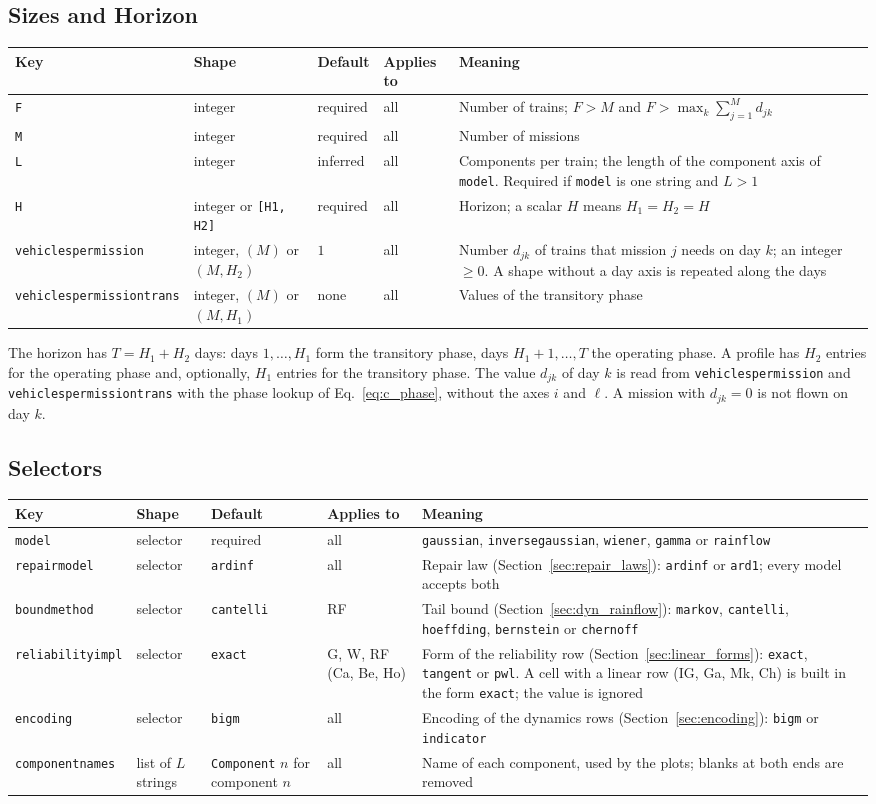 \documentclass[11pt,a4paper]{article}
\makeatletter
\theoremstyle{plain}
\theoremstyle{definition}
\renewcommand{\_}{\textunderscore\allowbreak{}}
\providecommand{\keyrow}[5]{{\raggedright #1\par} & {\raggedright #2\par} & {\raggedright #3\par} & {\raggedright #4\par} & {\raggedright #5\par} \\}
\providecommand{\tabstart}[2]{\begingroup\small\begin{longtable}{@{}#1@{}}\toprule #2 \\ \midrule \endhead}
\providecommand{\tabend}{\bottomrule\end{longtable}\endgroup}
\providecommand{\keytab}{\tabstart{p{3.2cm}p{2.2cm}p{1.8cm}p{1.9cm}p{4.5cm}}{Key & Shape & Default & Applies to & Meaning}}
\makeatother
\begin{document}
\subsection{Sizes and Horizon}\label{sec:input_scalars}

\keytab
\keyrow{\texttt{F}}{integer}{required}{all}{Number of trains; $F > M$ and $F > \max_k \sum_{j=1}^{M} d_{jk}$}
\keyrow{\texttt{M}}{integer}{required}{all}{Number of missions}
\keyrow{\texttt{L}}{integer}{inferred}{all}{Components per train; the length of the component axis of \texttt{model}. Required if \texttt{model} is one string and $L > 1$}
\keyrow{\texttt{H}}{integer or \texttt{[H1, H2]}}{required}{all}{Horizon; a scalar $H$ means $H_1 = H_2 = H$}
\keyrow{\texttt{vehicles\_per\_mission}}{integer, $(M)$ or $(M, H_2)$}{$1$}{all}{Number $d_{jk}$ of trains that mission $j$ needs on day $k$; an integer $\ge 0$. A shape without a day axis is repeated along the days}
\keyrow{\texttt{vehicles\_per\_mission\_trans}}{integer, $(M)$ or $(M, H_1)$}{none}{all}{Values of the transitory phase}
\tabend

The horizon has $T = H_1 + H_2$ days: days $1,\ldots,H_1$ form the transitory phase, days $H_1+1,\ldots,T$ the operating phase.
A profile has $H_2$ entries for the operating phase and, optionally, $H_1$ entries for the transitory phase.
The value $d_{jk}$ of day $k$ is read from \texttt{vehicles\_per\_mission} and \texttt{vehicles\_per\_mission\_trans} with the phase lookup of Eq.~\eqref{eq:c_phase}, without the axes $i$ and $\ell$.
A mission with $d_{jk} = 0$ is not flown on day $k$.

\subsection{Selectors}\label{sec:input_selectors}

\keytab
\keyrow{\texttt{model}}{selector}{required}{all}{\texttt{gaussian}, \texttt{inverse\_gaussian}, \texttt{wiener}, \texttt{gamma} or \texttt{rainflow}}
\keyrow{\texttt{repair\_model}}{selector}{\texttt{ardinf}}{all}{Repair law (Section~\ref{sec:repair_laws}): \texttt{ardinf} or \texttt{ard1}; every model accepts both}
\keyrow{\texttt{bound\_method}}{selector}{\texttt{cantelli}}{RF}{Tail bound (Section~\ref{sec:dyn_rainflow}): \texttt{markov}, \texttt{cantelli}, \texttt{hoeffding}, \texttt{bernstein} or \texttt{chernoff}}
\keyrow{\texttt{reliability\_impl}}{selector}{\texttt{exact}}{G, W, RF (Ca, Be, Ho)}{Form of the reliability row (Section~\ref{sec:linear_forms}): \texttt{exact}, \texttt{tangent} or \texttt{pwl}. A cell with a linear row (IG, Ga, Mk, Ch) is built in the form \texttt{exact}; the value is ignored}
\keyrow{\texttt{encoding}}{selector}{\texttt{bigm}}{all}{Encoding of the dynamics rows (Section~\ref{sec:encoding}): \texttt{bigm} or \texttt{indicator}}
\keyrow{\texttt{component\_names}}{list of $L$ strings}{\texttt{Component} $n$ for component $n$}{all}{Name of each component, used by the plots; blanks at both ends are removed}
\tabend
\end{document}
